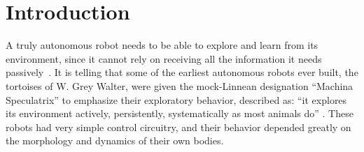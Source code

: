 
\section{Introduction}

A truly autonomous robot needs to be able to explore and learn from
its environment, since it cannot rely on receiving all the information
it needs passively~\cite{whaite97autonomous}.
It is telling that some of the earliest autonomous robots ever built,
the tortoises of W. Grey Walter, were given the mock-Linnean
designation ``Machina Speculatrix'' to emphasize their exploratory
behavior, described as: ``it explores its environment actively,
persistently, systematically as most animals do''
\cite{walter50imitation}.
These robots had very simple control circuitry, and their behavior
depended greatly on the morphology and dynamics of their own bodies.
%



